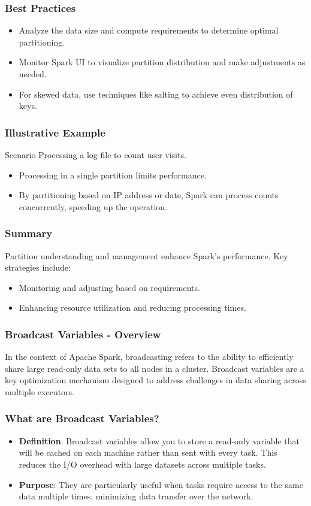 \documentclass[aspectratio=169]{beamer}
\begin{document}
\begin{frame}[fragile]
    \frametitle{Best Practices}
    \begin{itemize}
        \item Analyze the data size and compute requirements to determine optimal partitioning.
        \item Monitor Spark UI to visualize partition distribution and make adjustments as needed.
        \item For skewed data, use techniques like salting to achieve even distribution of keys.
    \end{itemize}
\end{frame}

\begin{frame}[fragile]
    \frametitle{Illustrative Example}
    \begin{block}{Scenario}
        Processing a log file to count user visits. 
        \begin{itemize}
            \item Processing in a single partition limits performance.
            \item By partitioning based on IP address or date, Spark can process counts concurrently, speeding up the operation.
        \end{itemize}
    \end{block}
\end{frame}

\begin{frame}[fragile]
    \frametitle{Summary}
    Partition understanding and management enhance Spark's performance. Key strategies include:
    \begin{itemize}
        \item Monitoring and adjusting based on requirements.
        \item Enhancing resource utilization and reducing processing times.
    \end{itemize}
\end{frame}

\begin{frame}[fragile]
    \frametitle{Broadcast Variables - Overview}
    In the context of Apache Spark, broadcasting refers to the ability to efficiently share large read-only data sets to all nodes in a cluster.
    Broadcast variables are a key optimization mechanism designed to address challenges in data sharing across multiple executors.
\end{frame}

\begin{frame}[fragile]
    \frametitle{What are Broadcast Variables?}
    \begin{itemize}
        \item \textbf{Definition}: Broadcast variables allow you to store a read-only variable that will be cached on each machine rather than sent with every task. This reduces the I/O overhead with large datasets across multiple tasks.
        \item \textbf{Purpose}: They are particularly useful when tasks require access to the same data multiple times, minimizing data transfer over the network.
    \end{itemize}
\end{frame}
\end{document}
